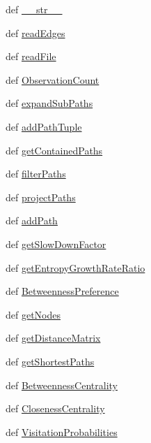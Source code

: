 \begin{DoxyCompactItemize}
\item 
def \hyperlink{classpathpy_1_1Paths_1_1Paths_afdbe49d3727f7fd3022899cb3130c6db}{\-\_\-\-\_\-str\-\_\-\-\_\-}
\item 
def \hyperlink{classpathpy_1_1Paths_1_1Paths_adba5db911e0be900c03908f8b2ca511e}{read\-Edges}
\item 
def \hyperlink{classpathpy_1_1Paths_1_1Paths_a349974504cf0ef9fd1ff97a0249e649e}{read\-File}
\item 
def \hyperlink{classpathpy_1_1Paths_1_1Paths_a4b4e13eb898dd55b9c1a381eaf22aea9}{Observation\-Count}
\item 
def \hyperlink{classpathpy_1_1Paths_1_1Paths_a6e1941415a937fa9aa86b6b442f858e1}{expand\-Sub\-Paths}
\item 
def \hyperlink{classpathpy_1_1Paths_1_1Paths_ab1c50bfee7d28f3a180fc036000bc146}{add\-Path\-Tuple}
\item 
def \hyperlink{classpathpy_1_1Paths_1_1Paths_af830708eaa318dd450193b8e6d7fb37a}{get\-Contained\-Paths}
\item 
def \hyperlink{classpathpy_1_1Paths_1_1Paths_a1c27b7c76d16437518f28734de2b86a5}{filter\-Paths}
\item 
def \hyperlink{classpathpy_1_1Paths_1_1Paths_a160fb269d25c24adc4fbfdc3df71075c}{project\-Paths}
\item 
def \hyperlink{classpathpy_1_1Paths_1_1Paths_a5af2d99bd84797a960e43bc78c57db5a}{add\-Path}
\item 
def \hyperlink{classpathpy_1_1Paths_1_1Paths_a60aa117d37a599f912122263bf9e3eea}{get\-Slow\-Down\-Factor}
\item 
def \hyperlink{classpathpy_1_1Paths_1_1Paths_a9bf65d20a97eb629a4d618a4e19160a7}{get\-Entropy\-Growth\-Rate\-Ratio}
\item 
def \hyperlink{classpathpy_1_1Paths_1_1Paths_afc66998bbb85b5fd3e7b8cd049a2bfa1}{Betweenness\-Preference}
\item 
def \hyperlink{classpathpy_1_1Paths_1_1Paths_a287a429de9a958ccc48658b9fb9f7665}{get\-Nodes}
\item 
def \hyperlink{classpathpy_1_1Paths_1_1Paths_a5b6ad214815f9fbd687c457d53367f19}{get\-Distance\-Matrix}
\item 
def \hyperlink{classpathpy_1_1Paths_1_1Paths_a99a295d0674ca4eb5ba6906b48893b26}{get\-Shortest\-Paths}
\item 
def \hyperlink{classpathpy_1_1Paths_1_1Paths_add4dc55240d6ca92645f3709152d0545}{Betweenness\-Centrality}
\item 
def \hyperlink{classpathpy_1_1Paths_1_1Paths_a45a27a4b5d8fe5aa368da221ab68502a}{Closeness\-Centrality}
\item 
def \hyperlink{classpathpy_1_1Paths_1_1Paths_a5c964af581ac3c48fbd2a3955f711bb2}{Visitation\-Probabilities}
\end{DoxyCompactItemize}

